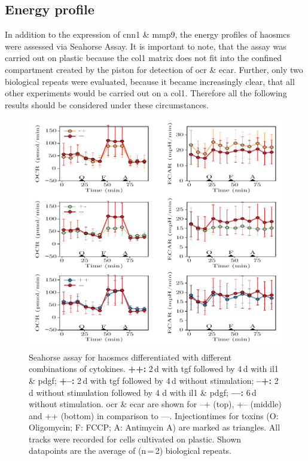     \subsection{Energy profile}
    \label{subsec:energy}
    In addition to the expression of \ac{cnn1} \& \ac{mmp9}, the energy profiles of \acp{haosmc} were assessed via Seahorse Assay. It is important to note, that the assay was carried out on plastic because the \ac{col1} matrix does not fit into the confined compartment created by the piston for detection of \ac{ocr} \& \ac{ecar}. Further, only two biological repeats were evaluated, because it became increasingly clear, that all other experiments would be carried out on a \ac{col1}. Therefore all the following results should be considered under these circumstances.

    \begin{figure}[h!]
    \capstart
        \centering
        \includegraphics{Abbildung/Seahorse_tracks.pdf}

        \begin{minipage}{\captionwidth}
            \caption[seahorse_tracks]{ \newline Seahorse assay for \acp{haosmc} differentiated with different combinations of cytokines.
            \textbf{++:} 2\,d with \ac{tgf} followed by 4\,d with \ac{il1} \& \ac{pdgf};
            \textbf{+–:} 2\,d with \ac{tgf} followed by 4\,d without stimulation;
            \textbf{–+:} 2\,d without stimulation followed by 4 d with \ac{il1} \& \ac{pdgf};
            \textbf{––:} 6\,d without stimulation.
            \ac{ocr} \& \ac{ecar} are shown for –+ (top), +– (middle) and ++ (bottom) in comparison to ––. Injectiontimes for toxins (O: Oligomycin; F: FCCP; A: Antimycin A) are marked as triangles. All tracks were recorded for cells cultivated on plastic. Shown datapoints are the average of (n\,=\,2) biological repeats.
            }
            \label{fig:seahorse_tracks}
        \end{minipage}
    \end{figure}

